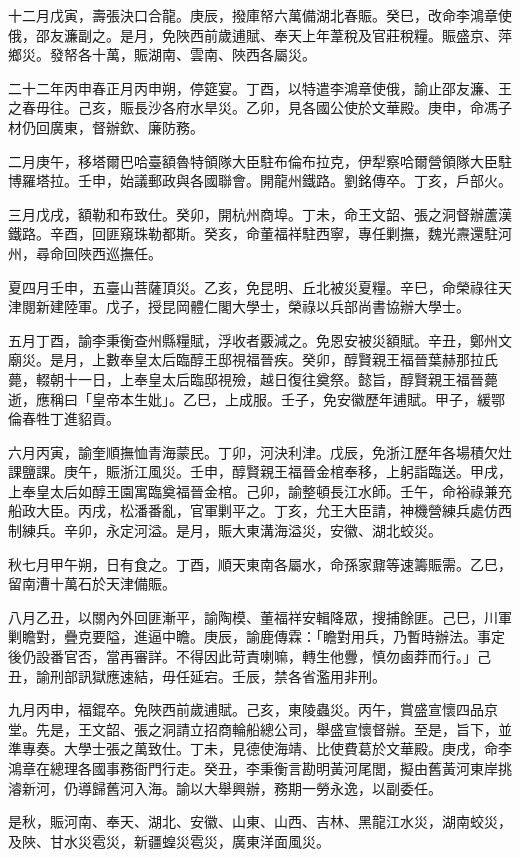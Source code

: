 \begin{pinyinscope}
十二月戊寅，壽張決口合龍。庚辰，撥庫帑六萬備湖北春賑。癸巳，改命李鴻章使俄，邵友濂副之。是月，免陜西前歲逋賦、奉天上年葦稅及官莊稅糧。賑盛京、萍鄉災。發帑各十萬，賑湖南、雲南、陜西各屬災。

二十二年丙申春正月丙申朔，停筵宴。丁酉，以特遣李鴻章使俄，諭止邵友濂、王之春毋往。己亥，賑長沙各府水旱災。乙卯，見各國公使於文華殿。庚申，命馮子材仍回廣東，督辦欽、廉防務。

二月庚午，移塔爾巴哈臺額魯特領隊大臣駐布倫布拉克，伊犁察哈爾營領隊大臣駐博羅塔拉。壬申，始議郵政與各國聯會。開龍州鐵路。劉銘傳卒。丁亥，戶部火。

三月戊戌，額勒和布致仕。癸卯，開杭州商埠。丁未，命王文韶、張之洞督辦蘆漢鐵路。辛酉，回匪窺珠勒都斯。癸亥，命董福祥駐西寧，專任剿撫，魏光燾還駐河州，尋命回陜西巡撫任。

夏四月壬申，五臺山菩薩頂災。乙亥，免昆明、丘北被災夏糧。辛巳，命榮祿往天津閱新建陸軍。戊子，授昆岡體仁閣大學士，榮祿以兵部尚書協辦大學士。

五月丁酉，諭李秉衡查州縣糧賦，浮收者覈減之。免恩安被災額賦。辛丑，鄭州文廟災。是月，上數奉皇太后臨醇王邸視福晉疾。癸卯，醇賢親王福晉葉赫那拉氏薨，輟朝十一日，上奉皇太后臨邸視殮，越日復往奠祭。懿旨，醇賢親王福晉薨逝，應稱曰「皇帝本生妣」。乙巳，上成服。壬子，免安徽歷年逋賦。甲子，緩鄂倫春牲丁進貂貢。

六月丙寅，諭奎順撫恤青海蒙民。丁卯，河決利津。戊辰，免浙江歷年各場積欠灶課鹽課。庚午，賑浙江風災。壬申，醇賢親王福晉金棺奉移，上躬詣臨送。甲戌，上奉皇太后如醇王園寓臨奠福晉金棺。己卯，諭整頓長江水師。壬午，命裕祿兼充船政大臣。丙戌，松潘番亂，官軍剿平之。丁亥，允王大臣請，神機營練兵處仿西制練兵。辛卯，永定河溢。是月，賑大東溝海溢災，安徽、湖北蛟災。

秋七月甲午朔，日有食之。丁酉，順天東南各屬水，命孫家鼐等速籌賑需。乙巳，留南漕十萬石於天津備賑。

八月乙丑，以關內外回匪漸平，諭陶模、董福祥安輯降眾，搜捕餘匪。己巳，川軍剿瞻對，疊克要隘，進逼中瞻。庚辰，諭鹿傳霖：「瞻對用兵，乃暫時辦法。事定後仍設番官否，當再審詳。不得因此苛責喇嘛，轉生他釁，慎勿鹵莽而行。」己丑，諭刑部訊獄應速結，毋任延宕。壬辰，禁各省濫用非刑。

九月丙申，福錕卒。免陜西前歲逋賦。己亥，東陵蟲災。丙午，賞盛宣懷四品京堂。先是，王文韶、張之洞請立招商輪船總公司，舉盛宣懷督辦。至是，旨下，並準專奏。大學士張之萬致仕。丁未，見德使海靖、比使費葛於文華殿。庚戌，命李鴻章在總理各國事務衙門行走。癸丑，李秉衡言勘明黃河尾閭，擬由舊黃河東岸挑濬新河，仍導歸舊河入海。諭以大舉興辦，務期一勞永逸，以副委任。

是秋，賑河南、奉天、湖北、安徽、山東、山西、吉林、黑龍江水災，湖南蛟災，及陜、甘水災雹災，新疆蝗災雹災，廣東洋面風災。


\end{pinyinscope}
